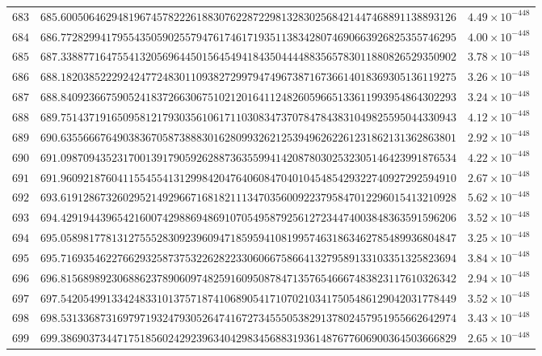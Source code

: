 \documentclass[12pt,reqno]{amsart}
\theoremstyle{remark}
\begin{document}
\begin{longtable}{clc}
$683$ & $685.6005064629481967457822261883076228722981328302568421447468891138893126$ & $4.49\times 10^{-448}$ \\
$684$ & $686.7728299417955435059025579476174617193511383428074690663926825355746295$ & $4.00\times 10^{-448}$ \\
$685$ & $687.3388771647554132056964450156454941843504444883565783011880826529350902$ & $3.78\times 10^{-448}$ \\
$686$ & $688.1820385222924247724830110938272997947496738716736614018369305136119275$ & $3.26\times 10^{-448}$ \\
$687$ & $688.8409236675905241837266306751021201641124826059665133611993954864302293$ & $3.24\times 10^{-448}$ \\
$688$ & $689.7514371916509581217930356106171103083473707847843831049825595044330943$ & $4.12\times 10^{-448}$ \\
$689$ & $690.6355666764903836705873888301628099326212539496262261231862131362863801$ & $2.92\times 10^{-448}$ \\
$690$ & $691.0987094352317001391790592628873635599414208780302532305146423991876534$ & $4.22\times 10^{-448}$ \\
$691$ & $691.9609218760411554554131299842047640608470401045485429322740927292594910$ & $2.67\times 10^{-448}$ \\
$692$ & $693.6191286732602952149296671681821113470356009223795847012296015413210928$ & $5.62\times 10^{-448}$ \\
$693$ & $694.4291944396542160074298869486910705495879256127234474003848363591596206$ & $3.52\times 10^{-448}$ \\
$694$ & $695.0589817781312755528309239609471859594108199574631863462785489936804847$ & $3.25\times 10^{-448}$ \\
$695$ & $695.7169354622766293258737532262822330606675866413279589133103351325823694$ & $3.84\times 10^{-448}$ \\
$696$ & $696.8156898923068862378906097482591609508784713576546667483823117610326342$ & $2.94\times 10^{-448}$ \\
$697$ & $697.5420549913342483310137571874106890541710702103417505486129042031778449$ & $3.52\times 10^{-448}$ \\
$698$ & $698.5313368731697971932479305264741672734555053829137802457951955662642974$ & $3.43\times 10^{-448}$ \\
$699$ & $699.3869037344717518560242923963404298345688319361487677606900364503666829$ & $2.65\times 10^{-448}$ \\

\end{longtable}
\end{document}
